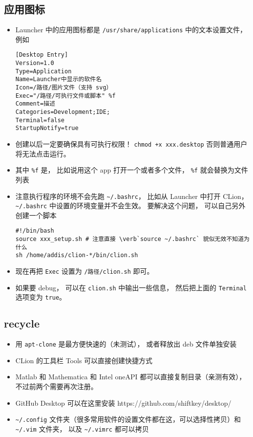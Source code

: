\subsection{应用图标}
\begin{itemize}
\item Launcher 中的应用图标都是 \verb`/usr/share/applications` 中的文本设置文件， 例如
\begin{lstlisting}[language=none,caption=xxx.desktop]
[Desktop Entry]
Version=1.0
Type=Application
Name=Launcher中显示的软件名
Icon=/路径/图片文件（支持 svg）
Exec="/路径/可执行文件或脚本" %f
Comment=描述
Categories=Development;IDE;
Terminal=false
StartupNotify=true
\end{lstlisting}
\item 创建以后一定要确保具有可执行权限！ \verb`chmod +x xxx.desktop` 否则普通用户将无法点击运行。
\item 其中 \verb`%f` 是， 比如说用这个 app 打开一个或者多个文件， \verb`%f` 就会替换为文件列表
\item 注意执行程序的环境不会先跑 \verb`~/.bashrc`， 比如从 Launcher 中打开 CLion， \verb`~/.bashrc` 中设置的环境变量并不会生效。 要解决这个问题， 可以自己另外创建一个脚本
\begin{lstlisting}[language=none,caption=clion.sh]
#!/bin/bash
source xxx_setup.sh # 注意直接 \verb`source ~/.bashrc` 貌似无效不知道为什么
sh /home/addis/clion-*/bin/clion.sh
\end{lstlisting}
\item 现在再把 \verb`Exec` 设置为 \verb`/路径/clion.sh` 即可。
\item 如果要 debug， 可以在 \verb`clion.sh` 中输出一些信息， 然后把上面的 \verb`Terminal` 选项变为 \verb`true`。
\end{itemize}


\subsection{recycle}
\begin{itemize}
\item 用 \verb`apt-clone` 是最方便快速的（未测试）， 或者释放出 deb 文件单独安装
\item CLion 的工具栏 Tools 可以直接创建快捷方式
\item Matlab 和 Mathematica 和 Intel oneAPI 都可以直接复制目录（亲测有效）， 不过前两个需要再次注册。
\item GitHub Desktop 可以在这里安装 https://github.com/shiftkey/desktop/
\item \verb`~/.config` 文件夹（很多常用软件的设置文件都在这，可以选择性拷贝）和 \verb`~/.vim` 文件夹， 以及 \verb`~/.vimrc` 都可以拷贝
\end{itemize}
